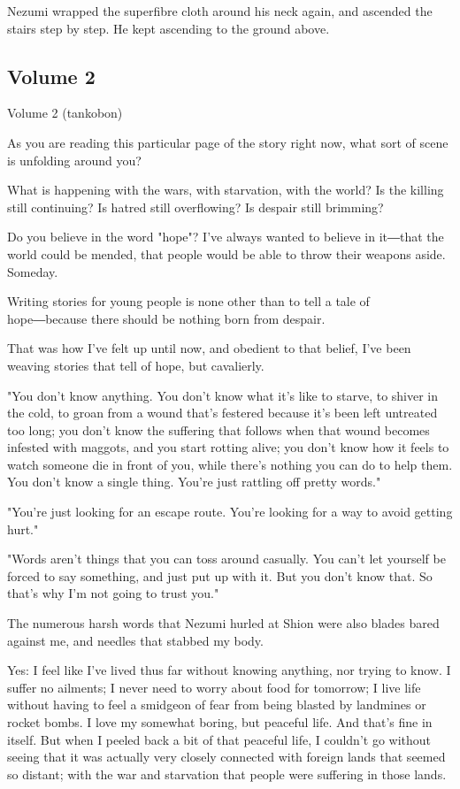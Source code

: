 Nezumi wrapped the superfibre cloth around his neck again, and ascended
the stairs step by step. He kept ascending to the ground above.

\protect\hypertarget{index_split_138.html}{}{}

\hypertarget{index_split_138.htmlux5cux23calibre_pb_142}{%
\subsection{Volume 2}\label{index_split_138.htmlux5cux23calibre_pb_142}}

Volume 2 (tankobon)

As you are reading this particular page of the story right now, what
sort of scene is unfolding around you?

What is happening with the wars, with starvation, with the world? Is the
killing still continuing? Is hatred still overflowing? Is despair still
brimming?

Do you believe in the word "hope"? I've always wanted to believe in
it―that the world could be mended, that people would be able to throw
their weapons aside. Someday.

Writing stories for young people is none other than to tell a tale of
hope―because there should be nothing born from despair.

That was how I've felt up until now, and obedient to that belief, I've
been weaving stories that tell of hope, but cavalierly.

"You don't know anything. You don't know what it's like to starve, to
shiver in the cold, to groan from a wound that's festered because it's
been left untreated too long; you don't know the suffering that follows
when that wound becomes infested with maggots, and you start rotting
alive; you don't know how it feels to watch someone die in front of you,
while there's nothing you can do to help them. You don't know a single
thing. You're just rattling off pretty words."

"You're just looking for an escape route. You're looking for a way to
avoid getting hurt."

"Words aren't things that you can toss around casually. You can't let
yourself be forced to say something, and just put up with it. But you
don't know that. So that's why I'm not going to trust you."

The numerous harsh words that Nezumi hurled at Shion were also blades
bared against me, and needles that stabbed my body.

Yes: I feel like I've lived thus far without knowing anything, nor
trying to know. I suffer no ailments; I never need to worry about food
for tomorrow; I live life without having to feel a smidgeon of fear from
being blasted by landmines or rocket bombs. I love my somewhat boring,
but peaceful life. And that's fine in itself. But when I peeled back a
bit of that peaceful life, I couldn't go without seeing that it was
actually very closely connected with foreign lands that seemed so
distant; with the war and starvation that people were suffering in those
lands.

